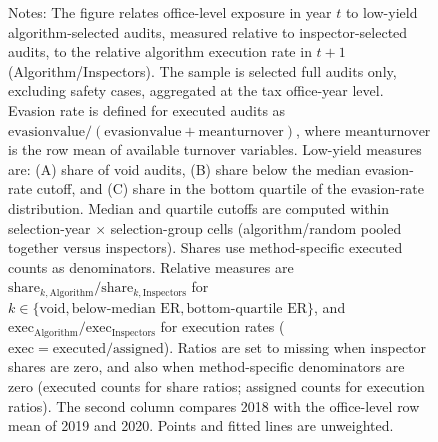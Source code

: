 \begin{figure}[H]
\begin{tablenotes}
    \footnotesize \item Notes: The figure relates office-level exposure in year \(t\) to low-yield algorithm-selected audits, measured relative to inspector-selected audits, to the relative algorithm execution rate in \(t+1\) (Algorithm/Inspectors). The sample is selected full audits only, excluding safety cases, aggregated at the tax office-year level. Evasion rate is defined for executed audits as \(\text{evasionvalue}/(\text{evasionvalue}+\text{meanturnover})\), where \(\text{meanturnover}\) is the row mean of available turnover variables. Low-yield measures are: (A) share of void audits, (B) share below the median evasion-rate cutoff, and (C) share in the bottom quartile of the evasion-rate distribution. Median and quartile cutoffs are computed within selection-year \(\times\) selection-group cells (algorithm/random pooled together versus inspectors). Shares use method-specific executed counts as denominators. Relative measures are \(\text{share}_{k,\text{Algorithm}}/\text{share}_{k,\text{Inspectors}}\) for \(k\in\{\text{void},\text{below-median ER},\text{bottom-quartile ER}\}\), and \(\text{exec}_{\text{Algorithm}}/\text{exec}_{\text{Inspectors}}\) for execution rates (\(\text{exec}=\text{executed}/\text{assigned}\)). Ratios are set to missing when inspector shares are zero, and also when method-specific denominators are zero (executed counts for share ratios; assigned counts for execution ratios). The second column compares 2018 with the office-level row mean of 2019 and 2020. Points and fitted lines are unweighted.
    \end{tablenotes}
\end{figure}
